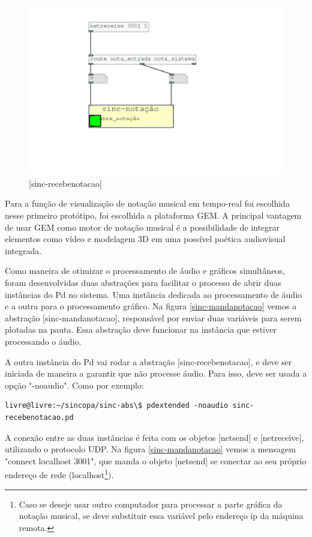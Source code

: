 \documentclass{ppgmus}
\begin{document}
\begin{figure}
\includegraphics[scale=.6]{sinc-recebenotacao}
\caption{[sinc-recebenotacao]}
\label{sinc-recebenotacao}
\end{figure} 

Para a função de visualização de notação musical
em tempo-real foi escolhida nesse primeiro protótipo, foi escolhida a plataforma GEM.
A principal vantagem de usar GEM como motor de notação musical é a possibilidade
de integrar elementos como vídeo e modelagem 3D em uma possível poética audiovisual integrada.

Como maneira de otimizar o processamento de áudio e gráficos simultâneos, foram desenvolvidas
 duas abstrações para facilitar o processo de abrir duas instâncias do Pd no sistema. Uma instância dedicada
ao processamento de áudio e a outra para o processamento gráfico.
Na figura \ref{sinc-mandanotacao} vemos a abstração [sinc-mandanotacao], responsável por enviar duas variáveis
para serem plotadas na pauta. Essa abstração deve funcionar na instância que estiver processando o áudio.

A outra instância do Pd vai rodar a abstração [sinc-recebenotacao], e deve ser iniciada de maneira a garantir 
que não processe áudio. Para isso, deve ser usada a opção "-noaudio".
Como por exemplo:

\begin{verbatim}
livre@livre:~/sincopa/sinc-abs\$ pdextended -noaudio sinc-recebenotacao.pd 
\end{verbatim} 

A conexão entre as duas instâncias é feita com os objetos [netsend] e [netreceive], utilizando o protocolo
UDP. Na figura \ref{sinc-mandanotacao} vemos a mensagem "connect localhost 3001", que manda o objeto
[netsend] se conectar ao seu próprio endereço de rede (localhost\footnote{Caso se deseje usar outro computador
para processar a parte gráfica da notação musical, se deve substituir essa variável pelo endereço ip da máquina remota.}).
\end{document}
